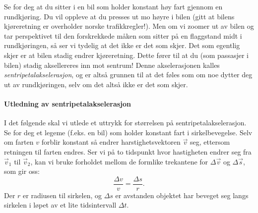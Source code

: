 Se for deg at du sitter i en bil som holder konstant høy fart gjennom en rundkjøring. Du vil oppleve at du presses ut mo høyre i bilen (gitt at bilens kjøreretning er overholder norske trafikkregler!). Men om vi zoomer ut av bilen og tar perspektivet til den forskrekkede måken som sitter på en flaggstand midt i rundkjøringen, så ser vi tydelig at det ikke er det som skjer. Det som egentlig skjer er at bilen stadig endrer kjøreretning. Dette fører til at du (som passasjer i bilen) stadig aksellereres inn mot sentrum! Denne akselerasjonen kalles \textit{sentripetalakselerasjon}, og er altså grunnen til at det føles som om noe dytter deg ut av rundkjøringen, selv om det altså ikke er det som skjer.

\paragraph{Utledning av sentripetalakselerasjon} I det følgende skal vi utlede et uttrykk for størrelsen på sentripetalakselerasjon. 
Se for deg et legeme (f.eks. en bil) som holder konstant fart i sirkelbevegelse. Selv om farten \( v \) forblir konstant så endrer harstighetsvektoren \( \vec{v} \) seg, ettersom retningen til farten endres. Ser vi på to tidspunkt hvor hastigheten endrer seg fra \( \vec{v}_1 \) til \( \vec{v}_2 \), kan vi bruke forholdet mellom de formlike trekantene for \( \Delta \vec{v} \) og \( \Delta \vec{s} \), som gir oss:
    \[
    \frac{\Delta v}{v} = \frac{\Delta s}{r}.
    \]
    Der \( r \) er radiusen til sirkelen, og \( \Delta s \) er avstanden objektet har beveget seg langs sirkelen i løpet av et lite tidsintervall \( \Delta t \). 


